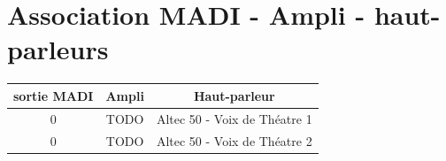 \documentclass[12pt,a4paper]{report}
\begin{document}
 \chapter*{Association MADI - Ampli - haut-parleurs}
 \begin{center}
 \begin{tabular}{|c|c|c|}
 \hline 
 sortie MADI & Ampli & Haut-parleur \\ 
\hline 
0 & TODO & Altec 50 - Voix de Théatre 1 \\ 
 \hline 
0 & TODO & Altec 50 - Voix de Théatre 2 \\ 
 \hline 

 \end{tabular}  

 \end{center}
 
\end{document}
